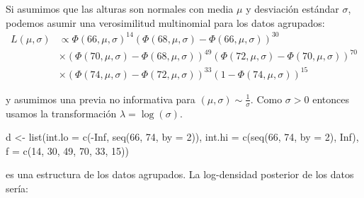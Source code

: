 \documentclass[
  12pt,
]{book}
\newenvironment{Shaded}{\begin{snugshade}}{\end{snugshade}}
\newcommand{\AttributeTok}[1]{\textcolor[rgb]{0.77,0.63,0.00}{#1}}
\newcommand{\ConstantTok}[1]{\textcolor[rgb]{0.00,0.00,0.00}{#1}}
\newcommand{\ControlFlowTok}[1]{\textcolor[rgb]{0.13,0.29,0.53}{\textbf{#1}}}
\newcommand{\DecValTok}[1]{\textcolor[rgb]{0.00,0.00,0.81}{#1}}
\newcommand{\FunctionTok}[1]{\textcolor[rgb]{0.00,0.00,0.00}{#1}}
\newcommand{\NormalTok}[1]{#1}
\newcommand{\OtherTok}[1]{\textcolor[rgb]{0.56,0.35,0.01}{#1}}
\newcommand{\SpecialCharTok}[1]{\textcolor[rgb]{0.00,0.00,0.00}{#1}}
\theoremstyle{definition}
\theoremstyle{definition}
\theoremstyle{definition}
\theoremstyle{definition}
\theoremstyle{remark}
\begin{document}
Si asumimos que las alturas son normales con media \(\mu\) y desviación estándar \(\sigma\), podemos asumir una verosimilitud multinomial para los datos agrupados:
\begin{align*}
L(\mu,\sigma)&\propto \Phi(66,\mu,\sigma)^{14}(\Phi(68,\mu,\sigma)-\Phi(66,\mu,\sigma))^{30} \\
&\times  (\Phi(70,\mu,\sigma)-\Phi(68,\mu,\sigma))^{49} (\Phi(72,\mu,\sigma)-\Phi(70,\mu,\sigma))^{70}\\
&\times  (\Phi(74,\mu,\sigma)-\Phi(72,\mu,\sigma))^{33} (1-\Phi(74,\mu,\sigma))^{15}
\end{align*}

y asumimos una previa no informativa para \((\mu,\sigma)\sim \frac 1 \sigma\). Como \(\sigma>0\) entonces usamos la transformación \(\lambda=\log (\sigma)\).

\begin{Shaded}
\begin{Highlighting}[]
\NormalTok{d }\OtherTok{\textless{}{-}} \FunctionTok{list}\NormalTok{(}\AttributeTok{int.lo =} \FunctionTok{c}\NormalTok{(}\SpecialCharTok{{-}}\ConstantTok{Inf}\NormalTok{, }\FunctionTok{seq}\NormalTok{(}\DecValTok{66}\NormalTok{, }\DecValTok{74}\NormalTok{, }\AttributeTok{by =} \DecValTok{2}\NormalTok{)), }\AttributeTok{int.hi =} \FunctionTok{c}\NormalTok{(}\FunctionTok{seq}\NormalTok{(}\DecValTok{66}\NormalTok{,}
    \DecValTok{74}\NormalTok{, }\AttributeTok{by =} \DecValTok{2}\NormalTok{), }\ConstantTok{Inf}\NormalTok{), }\AttributeTok{f =} \FunctionTok{c}\NormalTok{(}\DecValTok{14}\NormalTok{, }\DecValTok{30}\NormalTok{, }\DecValTok{49}\NormalTok{, }\DecValTok{70}\NormalTok{, }\DecValTok{33}\NormalTok{, }\DecValTok{15}\NormalTok{))}
\end{Highlighting}
\end{Shaded}

es una estructura de los datos agrupados. La log-densidad posterior de los datos sería:

\begin{Shaded}
\end{Shaded}
\end{document}
